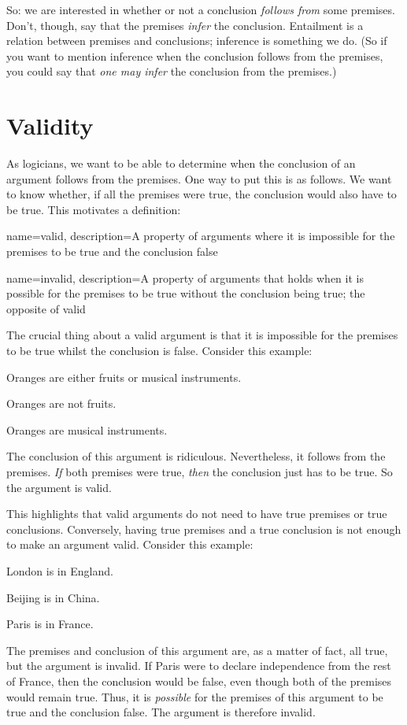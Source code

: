 So: we are interested in whether or not a conclusion \emph{follows from} some premises. Don't, though, say that the premises \emph{infer} the conclusion. Entailment is a relation between premises and conclusions; inference is something we do. (So if you want to mention inference when the conclusion follows from the premises, you could say that \emph{one may infer} the conclusion from the premises.)

\section{Validity}

As logicians, we want to be able to determine when the conclusion of an argument follows from the premises. One way to put this is as follows. We want to know whether, if all the premises were true, the conclusion would also have to be true. This motivates a definition:

{
name=valid,
description={A property of arguments where it is impossible for the premises to be true and the conclusion false}
}

{
name=invalid,
description={A property of arguments that holds when it is possible for the premises to be true without the conclusion being true; the opposite of \gls{valid}}
}
        
The crucial thing about a valid argument is that it is impossible for the premises to be true whilst the conclusion is false. Consider this example:
	\begin{earg}
		\item[] Oranges are either fruits or musical instruments.
		\item[] Oranges are not fruits.
		\item[\therefore] Oranges are musical instruments.
	\end{earg}
The conclusion of this argument is ridiculous. Nevertheless, it follows from the premises. \emph{If} both premises were true, \emph{then} the conclusion just has to be true. So the argument is valid. 

This highlights that valid arguments do not need to have true premises or true conclusions. Conversely, having true premises and a true conclusion is not enough to make an argument valid. Consider this example:
	\begin{earg}
		\item[] London is in England.
		\item[] Beijing is in China.
		\item[\therefore] Paris is in France.
	\end{earg}
The premises and conclusion of this argument are, as a matter of fact, all true, but the argument is invalid. If Paris were to declare independence from the rest of France, then the conclusion would be false, even though both of the premises would remain true. Thus, it is \emph{possible} for the premises of this argument to be true and the conclusion false. The argument is therefore invalid.

